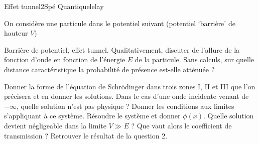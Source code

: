 \begin{exercise}{Effet tunnel}{2}{Spé}
{Quantique}{lelay}

On considère une particule dans le potentiel suivant (potentiel `barrière' de hauteur $V$)

\begin{center}
\end{center}

\begin{questions}
    \questioncours Barrière de potentiel, effet tunnel.
    \question Qualitativement, discuter de l'allure de la fonction d'onde en fonction de l'énergie $E$ de la particule.
    \question Sans calculs, sur quelle distance caractéristique la probabilité de présence est-elle atténuée ?
    
\begin{center}
\end{center}
    \question Donner la forme de l'équation de Schrödinger dans trois zones I, II et III que l'on précisera et en donner les solutions. Dans le cas d'une onde incidente venant de $-\infty$, quelle solution n'est pas physique ?
    \question Donner les conditions aux limites s'appliquant à ce système.
    \question Résoudre le système et donner $\phi(x)$.
    \question Quelle solution devient négligeable dans la limite $V \gg E$ ? Que vaut alors le coefficient de transmission ?
    \question Retrouver le résultat de la question 2.

\end{questions}

\end{exercise}